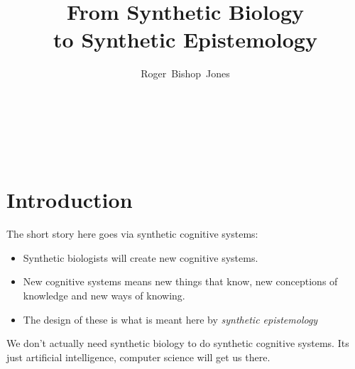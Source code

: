 \documentclass[14pt,titlepage]{extarticle}
\title{From Synthetic Biology \\to Synthetic Epistemology}
\author{Roger~Bishop~Jones}
\date{\ }
\newcommand{\ignore}[1]{}
\begin{document}

                               
\begin{titlepage}
\maketitle





\end{titlepage}

\ \

\ignore{
\begin{centering}
{\LARGE \bf From \\Synthetic Biology \\to \\Synthetic Epistemology\\}
\end{centering}
}%

\setcounter{tocdepth}{1}
{\parskip-0pt\tableofcontents}




\section{Introduction}

The short story here goes via synthetic cognitive systems:
\begin{itemize}
\item Synthetic biologists will create new cognitive systems.
\item New cognitive systems means new things that know, new conceptions of knowledge and new ways of knowing.
\item The design of these is what is meant here by {\it synthetic epistemology}
\end{itemize}

We don't actually need synthetic biology to do synthetic cognitive systems.
Its just artificial intelligence, computer science will get us there.
\end{document}
